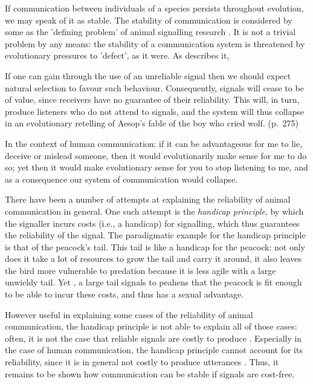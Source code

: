 If communication between individuals of a species persists throughout evolution, we may speak of it as stable. The stability of communication is considered by some as the 'defining problem' of animal signalling research \citep{Scott-Phillips08}. It is not a trivial problem by any means: the stability of a communication system is threatened by evolutionary pressures to 'defect', as it were. As \citet{Scott-Phillips08} describes it,
\begin{quoting}
    If one can gain through the use of an unreliable signal then we should expect natural selection to favour such behaviour. Consequently, signals will cease to be of value, since receivers have no guarantee of their reliability. This will, in turn, produce listeners who do not attend to signals, and the system will thus collapse in an evolutionary retelling of Aesop’s fable of the boy who cried wolf.
    \hfill (p.~275)
\end{quoting}
In the context of human communication: if it can be advantageous for me to lie, deceive or mislead someone, then it would evolutionarily make sense for me to do so; yet then it would make evolutionary sense for you to stop listening to me, and as a consequence our system of communication would collapse.

There have been a number of attempts at explaining the reliability of animal communication in general. One such attempt is the \emph{handicap principle}, by which the signaller incurs costs (i.e., a handicap) for signalling, which thus guarantees the reliability of the signal. The paradigmatic example for the handicap principle is that of the peacock's tail. This tail is like a handicap for the peacock: not only does it take a lot of resources to grow the tail and carry it around, it also leaves the bird more vulnerable to predation because it is less agile with a large unwieldy tail. Yet , a large tail signals to peahens that the peacock is fit enough to be able to incur these costs, and thus has a sexual advantage. 

However useful in explaining some cases of the reliability of animal communication, the handicap principle is not able to explain all of those cases: often, it is not the case that reliable signals are costly to produce \citep{Scott-Phillips08} . Especially in the case of human communication, the handicap principle cannot account for its reliability, since it is in general not costly to produce utterances \citep{Scott-Phillips08}.
Thus, it remains to be shown how communication can be stable if signals are cost-free.

